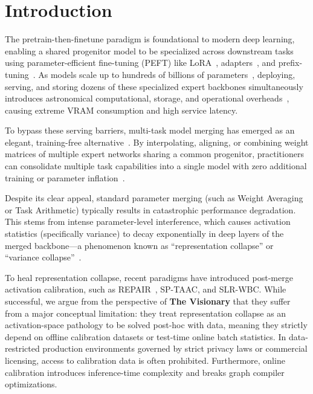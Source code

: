 \documentclass{article}
\begin{document}
\section{Introduction}
\label{sec:intro}
The pretrain-then-finetune paradigm is foundational to modern deep learning, enabling a shared progenitor model to be specialized across downstream tasks~\cite{vaswani2017attention, devlin2018bert, deng2009imagenet} using parameter-efficient fine-tuning (PEFT) like LoRA~\cite{hu2021lora}, adapters~\cite{houlsby2019parameter}, and prefix-tuning~\cite{li2021prefix}. As models scale up to hundreds of billions of parameters~\cite{kaplan2020scaling, shazeer2017outrageously}, deploying, serving, and storing dozens of these specialized expert backbones simultaneously introduces astronomical computational, storage, and operational overheads~\cite{caruana1997multitask}, causing extreme VRAM consumption and high service latency.

To bypass these serving barriers, multi-task model merging has emerged as an elegant, training-free alternative~\cite{wortsman2022model, ilharco2022editing}. By interpolating, aligning, or combining weight matrices of multiple expert networks sharing a common progenitor, practitioners can consolidate multiple task capabilities into a single model with zero additional training or parameter inflation~\cite{ainsworth2022git, jin2022regmean, stoica2023zipit, mucke2023clones}. 

Despite its clear appeal, standard parameter merging (such as Weight Averaging or Task Arithmetic) typically results in catastrophic performance degradation. This stems from intense parameter-level interference, which causes activation statistics (specifically variance) to decay exponentially in deep layers of the merged backbone---a phenomenon known as ``representation collapse'' or ``variance collapse''~\cite{jordan2023repair}.

To heal representation collapse, recent paradigms have introduced post-merge activation calibration, such as REPAIR~\cite{jordan2023repair}, SP-TAAC, and SLR-WBC. While successful, we argue from the perspective of \textbf{The Visionary} that they suffer from a major conceptual limitation: they treat representation collapse as an activation-space pathology to be solved post-hoc with data, meaning they strictly depend on offline calibration datasets or test-time online batch statistics. In data-restricted production environments governed by strict privacy laws or commercial licensing, access to calibration data is often prohibited. Furthermore, online calibration introduces inference-time complexity and breaks graph compiler optimizations.
\end{document}
